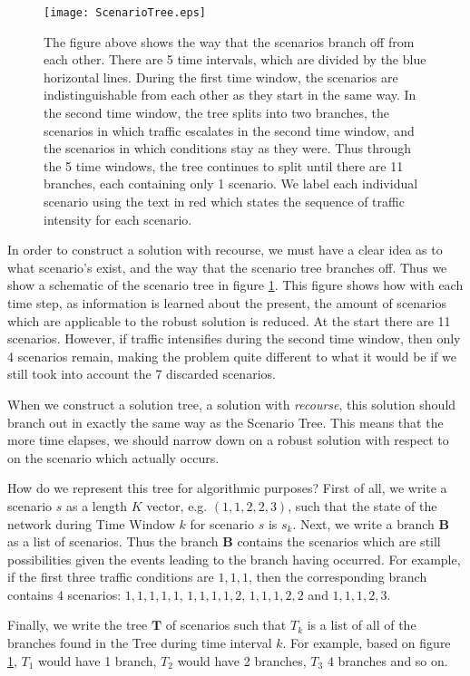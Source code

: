 \begin{figure}[h!]
	\centering
	\texttt{[image: ScenarioTree.eps]}
	\caption{The figure above shows the way that the scenarios branch off from each other. There are 5 time intervals, which are divided by the blue horizontal lines. During the first time window, the scenarios are indistinguishable from each other as they start in the same way. In the second time window, the tree splits into two branches, the scenarios in which traffic escalates in the second time window, and the scenarios in which conditions stay as they were. Thus through the 5 time windows, the tree continues to split until there are 11 branches, each containing only 1 scenario. We label each individual scenario using the text in red which states the sequence of traffic intensity for each scenario.}
	\label{fig:scenarioTree}
\end{figure}
In order to construct a solution with recourse, we must have a clear idea as to what scenario's exist, and the way that the scenario tree branches off. Thus we show a schematic of the scenario tree in figure \ref{fig:scenarioTree}. This figure shows how with each time step, as information is learned about the present, the amount of scenarios which are applicable to the robust solution is reduced. At the start there are 11 scenarios. However, if traffic intensifies during the second time window, then only 4 scenarios remain, making the problem quite different to what it would be if we still took into account the 7 discarded scenarios.

When we construct a solution tree, a solution with \textit{recourse}, this solution should branch out in exactly the same way as the Scenario Tree. This means that the more time elapses, we should narrow down on a robust solution with respect to on the scenario which actually occurs.

How do we represent this tree for algorithmic purposes? First of all, we write a scenario $s$ as a length $K$ vector, e.g. $(1,1,2,2,3)$, such that the state of the network during Time Window $k$ for scenario $s$ is $s_k$. Next, we write a branch $\mathbf{B}$ as a list of scenarios. Thus the branch $\mathbf{B}$ contains the scenarios which are still possibilities given the events leading to the branch having occurred. For example, if the first three traffic conditions are $1,1,1$, then the corresponding branch contains 4 scenarios: $1,1,1,1,1$, $1,1,1,1,2$, $1,1,1,2,2$ and $1,1,1,2,3$.

Finally, we write the tree $\mathbf{T}$ of scenarios such that $T_k$ is a list of all of the branches found in the Tree during time interval $k$. For example, based on figure \ref{fig:scenarioTree}, $T_1$ would have 1 branch, $T_2$ would have 2 branches, $T_3$ 4 branches and so on. 

